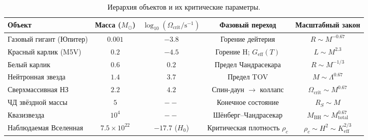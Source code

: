 \documentclass[11pt,a4paper]{article}
\begin{document}
	\begin{table}[htbp]
		\centering
		\caption{Иерархия объектов и их критические параметры.}
		\label{tab:hierarchy}
		\small
		\begin{tabular}{l c c c c}
			\toprule
			\textbf{Объект} & \textbf{Масса (\(M_\odot\))} & \(\log_{10}(\Omega_{\mathrm{crit}}/\mathrm{s^{-1}})\) & \textbf{Фазовый переход} & \textbf{Масштабный закон} \\
			\midrule
			Газовый гигант (Юпитер) & \(0.001\) & \(-3.8\) & Горение дейтерия & \(R\sim M^{-0.67}\) \\
			Красный карлик (M5V) & \(0.2\) & \(-4.5\) & Горение H; \(G_{\mathrm{eff}}(T)\) & \(L\sim M^{2.3}\) \\
			Белый карлик & \(0.6\) & \(0.2\) & Предел Чандрасекара & \(R\sim M^{-1/3}\) \\
			Нейтронная звезда & \(1.4\) & \(3.7\) & Предел TOV & \(M\sim\Lambda^{0.67}\) \\
			Сверхмассивная НЗ & \(2.2\) & \(4.2\) & Спин-даун \(\to\) коллапс & \(\Omega_{\mathrm{crit}}\sim M^{0.67}\) \\
			ЧД звёздной массы & \(5\) & \(--\) & Конечное состояние & \(R_S\sim M\) \\
			Квазизвезда & \(10^4\) & \(--\) & Шёнберг–Чандрасекар & \(M_{\mathrm{BH}}\sim M_{\mathrm{total}}^{0.67}\) \\
			Наблюдаемая Вселенная & \(7.5\times10^{22}\) & \(-17.7\) (\(H_0\)) & Критическая плотность \(\rho_c\) & \(\rho_c\sim H^2\sim K_{\mathrm{eff}}^{2/3}\) \\
			\bottomrule
		\end{tabular}
	\end{table}
	
\end{document}
